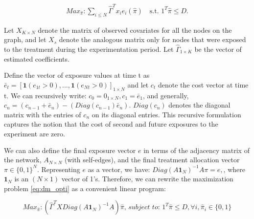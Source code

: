 \documentclass[11pt,a4paper]{article}
\begin{document}
\begin{align}\label{eq:dm_opti}
Max_{\hat \pi} : \sum_{i \leq N} \hat \Gamma^T x_i e_i(\hat \pi)  \quad \mbox{s.t. } 1^T \hat \pi \leq D .
\end{align}

\iffalse
This ends up being equivalent to this minimization (the equivalence to be clarified later):
%

$$ Min_{\hat \pi} E \left( Sup_\pi \left(\sum_{i \leq N} \Gamma^T x_i e_i(\pi) - c_\infty(\pi) \right) - \sum_{i \leq N} \hat \Gamma^T x_i e_i(\hat \pi) + c_\infty(\hat \pi) \right) $$
%
OR (depending on how $\hat \Gamma \rightarrow \Gamma$).

$$ Min_{\pi} E \left( Sup_\pi \left(\sum_{i \leq N} \Gamma^T x_i e_i(\pi) - c_\infty \right) - \sum_{i \leq N}  \Gamma^T x_i e_i(\pi) + \hat c_\infty \right) $$
\fi

Let $X_{K \times N}$ denote the matrix of observed covariates for all the nodes on the graph, and let $X_s$ denote the analogous matrix only for nodes that were exposed to the treatment during the experimentation period. Let $\hat \Gamma _{1 \times K}$ be the vector of estimated coefficients.

Define the vector of exposure values at time t as $\bar e_t=[\mathbf{1}(e_{1t}>0), \dots, \mathbf{1}(e_{Nt}>0)]_{1 \times N}$ and let $c_t$ denote the cost vector at time t.  We can recursively write: $c_0 = 0_{1 \times N}, c_1 = \bar e_1$, and generally, $c_n = (c_{n-1} + \bar e_n) - (Diag(c_{n-1})  \bar e_n) $. $Diag(c_n)$ denotes the diagonal matrix with the entries of $c_n$ on its diagonal entries. This recursive formulation captures the notion that the cost of second and future exposures to the experiment are zero.

We can also define the final exposure vector $e$ in terms of the adjacency matrix of the network, $A_{N \times N}$ (with self-edges), and the final treatment allocation vector $\pi \in \{0,1\}^N$. Representing $e$ as a vector, we have: $Diag(A \mathbf{1}_{N} ) ^{-1} A\pi  = e,$, where $\mathbf{1}_{N}$ is an $(N \times 1)$ vector of 1's. Therefore, we can rewrite the maximization problem \eqref{eq:dm_opti} as a convenient linear program:

$$Max_{\hat \pi}: \left(\hat \Gamma^T X Diag(A \mathbf{1}_{N} ) ^{-1} A \right) \hat \pi  \textit{, subject to: } 1^T \hat \pi \leq D , \forall i, \hat \pi_i \in \{0,1\} $$


\end{document}
